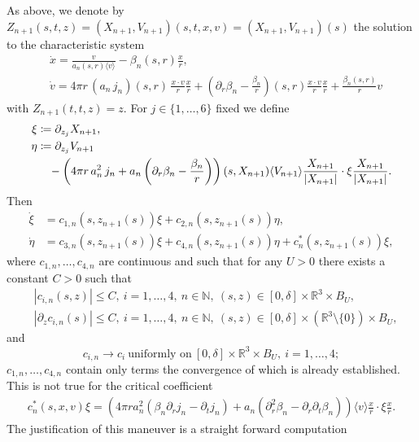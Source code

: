\documentclass[11pt]{article}
\def\R{\mathbb R}
\def\N{\mathbb N}
\def\p0{\langle v \rangle}
\begin{document}
As above, we denote by
$Z_{n+1}(s,t,z)=(X_{n+1},V_{n+1})(s,t,x,v) = (X_{n+1},V_{n+1})(s)$
the solution to the characteristic system
\begin{align}
  &
  \dot x =
  \frac{v}{a_n(s,r) \p0}-\beta_n(s,r)\frac{x}{r}, \label{xdot}\\
  &
  \dot v =
  4\pi r \,(a_n\, j_n)(s,r)\, \frac{x\cdot v}{r} \frac{x}{r}
  +\left(\partial_r\beta_n
  -\frac{\beta_n}{r}\right)(s,r)\frac{x\cdot v}{r} \frac{x}{r}
    +\frac{\beta_n(s,r)}{r} v \label{vdot}
\end{align}
with $Z_{n+1}(t,t,z)=z$. For $j\in \{1,\ldots,6\}$ fixed we define
\begin{align}
  \xi &\coloneqq \partial_{z_j} X_{n+1},\label{xidef}\\
  \eta &\coloneqq
  \partial_{z_j} V_{n+1}\notag \\
  &\quad{}
  - \left(4\pi r \,a_n^2\, j_n
  + a_n\left(\partial_r\beta_n-\frac{\beta_n}{r}\right)\right) (s,X_{n+1})
  \langle V_{n+1}\rangle \frac{X_{n+1}}{|X_{n+1}|}
  \cdot \xi \frac{X_{n+1}}{|X_{n+1}|}.
  \label{etadef}
\end{align}
Then
\begin{align}
  \dot \xi
  &=
  c_{1,n}(s,z_{n+1}(s)) \xi +  c_{2,n}(s,z_{n+1}(s)) \eta,\label{xidot}\\
  \dot \eta
  &=
  c_{3,n}(s,z_{n+1}(s)) \xi +  c_{4,n}(s,z_{n+1}(s)) \eta
  + c_{n}^\ast (s,z_{n+1}(s)) \xi,
  \label{etadot}
\end{align}
where $c_{1,n},\ldots,c_{4,n}$ are continuous and such that for any $U>0$
there exists a constant $C>0$ such that
\begin{align}\label{c_nbounds}
  & |c_{i,n}(s,z)| \leq C,\ i=1,\ldots,4,\ n\in \N,\
  (s,z)\in [0,\delta]\times \R^3 \times B_U,\\
 & |\partial_z c_{i,n}(s)| \leq C,\ i=1,\ldots,4,\ n\in \N,\
  (s,z)\in [0,\delta]\times (\R^3\setminus \{0\}) \times B_U,
\end{align}
and
\[
c_{i,n} \to c_i\ \mbox{uniformly on}\ [0,\delta]\times \R^3 \times B_U,\
i=1,\ldots,4;
\]
$c_{1,n},\ldots,c_{4,n}$ contain only terms the convergence
of which is already established.
This is not true for the critical coefficient 
\begin{align}\label{c_n5}
  c_{n}^\ast(s,x,v)\xi
  =
  \left(4\pi r a_n^2 (\beta_n \partial_r j_n - \partial_t j_n)
  + a_n (\partial_r^2 \beta_n - \partial_r\partial_t \beta_n)\right)
  \p0 \frac{x}{r}\cdot \xi \frac{x}{r}.
\end{align}
The justification of this maneuver is a straight forward computation
\end{document}

